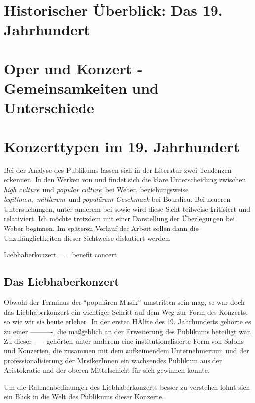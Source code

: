 \documentclass[a4paper, german, oneside]{scrbook}
\newcommand{\citet}[1]{\textcite{#1}}
\begin{document}
\section{Historischer Überblick: Das 19. Jahrhundert}
\label{histUberblick}
\section{Oper und Konzert - Gemeinsamkeiten und Unterschiede}
\label{operUndKonzert}
\section{Konzerttypen im 19. Jahrhundert}
\label{konzerttypen}
Bei der Analyse des Publikums lassen sich in der Literatur zwei Tendenzen erkennen. In den Werken von \citet{weber_music_2004} und \citet{bourdieu_feinen_2012} findet sich die klare Unterscheidung zwischen \emph{high culture} und \emph{popular culture} bei Weber, beziehungsweise \emph{legitimen}, \emph{mittlerem} und \emph{populärem Geschmack} bei Bourdieu. Bei neueren Untersuchungen, unter anderem bei \citet{gebesmair_grundzuge_2001} sowie \citet{muller_publikum_2014} wird diese Sicht teilweise kritisiert und relativiert. Ich möchte trotzdem mit einer Darstellung der Überlegungen bei Weber beginnen. Im späteren Verlauf der Arbeit sollen dann die Unzulänglichkeiten dieser Sichtweise diskutiert werden.

Liebhaberkonzert == benefit concert

\subsection{Das Liebhaberkonzert}
\label{liebhaber}
Obwohl der Terminus der \enquote{populären Musik} umstritten sein mag, so war doch das Liebhaberkonzert ein wichtiger Schritt auf dem Weg zur Form des Konzerts, so wie wir sie heute erleben. In der ersten HÄlfte des 19. Jahrhunderts gehörte es zu einer ----------, die maßgeblich an der Erweiterung des Publikums beteiligt war. Zu dieser ----- gehörten unter anderem eine institutionalisierte Form von Salons und Konzerten, die zusammen mit dem aufkeimendem Unternehmertum und der professionalisierung der MusikerInnen ein wachsendes Publikum aus der Aristokratie und der oberen Mittelschicht für sich gewinnen konnte.

Um die Rahmenbedinungen des Liebhaberkonzerts besser zu verstehen lohnt sich ein Blick in die Welt des Publikums dieser Konzerte.
\end{document}
